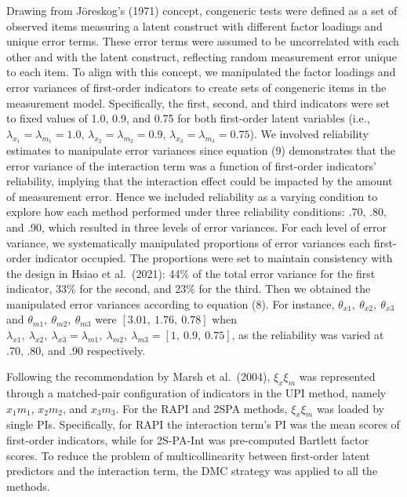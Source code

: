 \documentclass[
  man]{apa7}
\begin{document}
Drawing from Jöreskog's (1971) concept, congeneric tests were defined as a set of observed items measuring a latent construct with different factor loadings and unique error terms. These error terms were assumed to be uncorrelated with each other and with the latent construct, reflecting random measurement error unique to each item. To align with this concept, we manipulated the factor loadings and error variances of first-order indicators to create sets of congeneric items in the measurement model. Specifically, the first, second, and third indicators were set to fixed values of 1.0, 0.9, and 0.75 for both first-order latent variables (i.e., \(\lambda_{x_{1}} = \lambda_{m_{1}} = 1.0\), \(\lambda_{x_{2}} = \lambda_{m_{2}} = 0.9\), \(\lambda_{x_{3}} = \lambda_{m_{3}} = 0.75\)). We involved reliability estimates to manipulate error variances since equation (9) demonstrates that the error variance of the interaction term was a function of first-order indicators' reliability, implying that the interaction effect could be impacted by the amount of measurement error. Hence we included reliability as a varying condition to explore how each method performed under three reliability conditions: .70, .80, and .90, which resulted in three levels of error variances. For each level of error variance, we systematically manipulated proportions of error variances each first-order indicator occupied. The proportions were set to maintain consistency with the design in Hsiao et al.~(2021): 44\(\%\) of the total error variance for the first indicator, 33\(\%\) for the second, and 23\(\%\) for the third. Then we obtained the manipulated error variances according to equation (8). For instance, \(\theta_{x1}, \ \theta_{x2}, \ \theta_{x3}\) and \(\theta_{m1}, \ \theta_{m2}, \ \theta_{m3}\) were \([3.01, \ 1.76, \ 0.78]\) when \(\lambda_{x1}, \ \lambda_{x2}, \ \lambda_{x3} = \lambda_{m1}, \ \lambda_{m2}, \ \lambda_{m3} = [1, \ 0.9, \ 0.75]\), as the reliability was varied at .70, .80, and .90 respectively.

Following the recommendation by Marsh et al.~(2004), \(\xi_{x}\xi_{m}\) was represented through a matched-pair configuration of indicators in the UPI method, namely \(x_{1}m_{1}\), \(x_{2}m_{2}\), and \(x_{3}m_{3}\). For the RAPI and 2SPA methods, \(\xi_{x}\xi_{m}\) was loaded by single PIs. Specifically, for RAPI the interaction term's PI was the mean scores of first-order indicators, while for 2S-PA-Int was pre-computed Bartlett factor scores. To reduce the problem of multicollinearity between first-order latent predictors and the interaction term, the DMC strategy was applied to all the methods.
\end{document}

